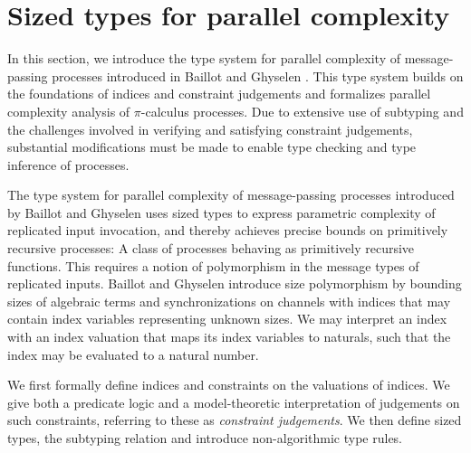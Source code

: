 \section{Sized types for parallel complexity}

In this section, we introduce the type system for parallel complexity of message-passing processes introduced in Baillot and Ghyselen \cite{BaillotGhyselen2021}. This type system builds on the foundations of indices and constraint judgements and formalizes parallel complexity analysis of $\pi$-calculus processes. Due to extensive use of subtyping and the challenges involved in verifying and satisfying constraint judgements, substantial modifications must be made to enable type checking and type inference of processes. 

The type system for parallel complexity of message-passing processes introduced by Baillot and Ghyselen uses sized types to express parametric complexity of replicated input invocation, and thereby achieves precise bounds on primitively recursive processes: A class of processes behaving as primitively recursive functions. This requires a notion of polymorphism in the message types of replicated inputs. Baillot and Ghyselen introduce size polymorphism by bounding sizes of algebraic terms and synchronizations on channels with indices that may contain index variables representing unknown sizes. We may interpret an index with an index valuation that maps its index variables to naturals, such that the index may be evaluated to a natural number.

We first formally define indices and constraints on the valuations of indices. We give both a predicate logic and a model-theoretic interpretation of judgements on such constraints, referring to these as \textit{constraint judgements}. We then define sized types, the subtyping relation and introduce non-algorithmic type rules.

